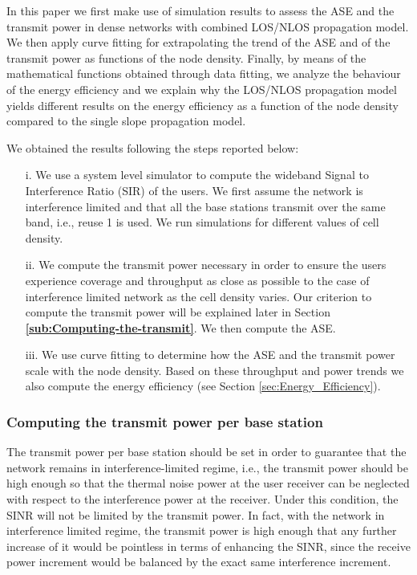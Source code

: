 \documentclass[twocoumn]{IEEEtran}
\begin{document}
In this paper we first make use of simulation results to assess the ASE and the transmit power in dense networks with combined LOS/NLOS propagation model. We then apply curve fitting for extrapolating the trend of the ASE and of the transmit power as functions of the node density. Finally, by means of the mathematical functions obtained through data fitting, we analyze the behaviour of the energy efficiency and we explain why the LOS/NLOS propagation model yields different results on the energy efficiency as a function of the node
density compared to the single slope propagation model. 

\noindent We obtained the results following the steps reported below: 
\begin{enumerate}
\item[i.] We use a system level simulator to compute the wideband  Signal to Interference Ratio (SIR)
of the users. We first assume the network is interference limited and
that all the base stations transmit over the same band, i.e., reuse
1 is used. We run simulations for different values of cell density. 
\item[ii.] We compute the transmit power necessary in order to ensure the users
experience coverage and throughput as close as possible to the case
of interference limited network as the cell density varies. Our criterion
to compute the transmit power will be explained later in Section \textbf{\eqref{sub:Computing-the-transmit}}. We then compute the ASE.
\item[iii.] We use curve fitting to determine how the ASE and the transmit
power scale with the node density. Based on these throughput and power trends
we also compute the energy efficiency (see Section \ref{sec:Energy_Efficiency}). 
\end{enumerate}

\subsubsection{Computing the transmit power per base station}\label{sub:Computing-the-transmit}

The transmit power per base station should be set in order to guarantee that the network remains in interference-limited regime, i.e.,  the transmit power should be high enough so that the thermal noise power at the user receiver can be neglected with respect to the interference power at the receiver. Under this condition, the SINR will not be limited by the transmit power. In fact, with the network in interference limited regime, the transmit power is high enough that any further increase of it would be pointless in terms of enhancing the SINR, since the receive power increment would be balanced by the exact same interference increment. 
\end{document}
